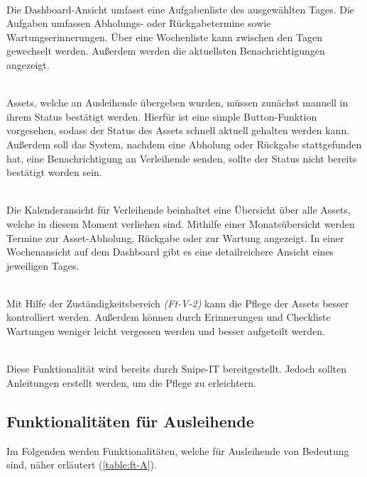 {\sffamily\color{maincolor}{Ft-V-1 | Dashboard }}\\
Die Dashboard-Ansicht umfasst eine Aufgabenliste des ausgewählten Tages. Die
Aufgaben umfassen Abholungs- oder Rückgabetermine sowie Wartungserinnerungen.
Über eine Wochenliste kann zwischen den Tagen gewechselt werden. Außerdem werden
die aktuellsten Benachrichtigungen angezeigt.

    {\sffamily\color{maincolor}{Ft-V-2 | Bearbeiten des Assetstatus }}\\
Assets, welche an Ausleihende übergeben wurden, müssen zunächst manuell in ihrem
Status bestätigt werden. Hierfür ist eine simple Button-Funktion vorgesehen,
sodass der Status des Assets schnell aktuell gehalten werden kann. Außerdem soll
das System, nachdem eine Abholung oder Rückgabe stattgefunden hat, eine
Benachrichtigung an Verleihende senden, sollte der Status nicht bereits
bestätigt worden sein.

    {\sffamily\color{maincolor}{Ft-B-4 | Kalenderansicht für Verleihende}}\\
Die Kalenderansicht für Verleihende beinhaltet eine Übersicht über alle Assets,
welche in diesem Moment verliehen sind. Mithilfe einer Monatsübersicht werden
Termine zur Asset-Abholung, Rückgabe oder zur Wartung angezeigt. In einer
Wochenansicht auf dem Dashboard gibt es eine detailreichere Ansicht eines
jeweiligen Tages.


    {\sffamily\color{maincolor}{Ft-V-3 | Pflege von Assets   }}\\
Mit Hilfe der Zuständigkeitsbereich \textit{(Ft-V-2)} kann die Pflege der Assets
besser kontrolliert werden. Außerdem können durch Erinnerungen und Checkliste
Wartungen weniger leicht vergessen werden und besser aufgeteilt werden.


    {\sffamily\color{maincolor}{Ft-V-4 | Pflege der Datenbank }}\\
Diese Funktionalität wird bereits durch Snipe-IT bereitgestellt. Jedoch sollten
Anleitungen erstellt werden, um die Pflege zu erleichtern. 

\subsection{Funktionalitäten für Ausleihende}
Im Folgenden werden Funktionalitäten, welche für Ausleihende von Bedeutung sind,
näher erläutert (\ref{table:ft-A}).

